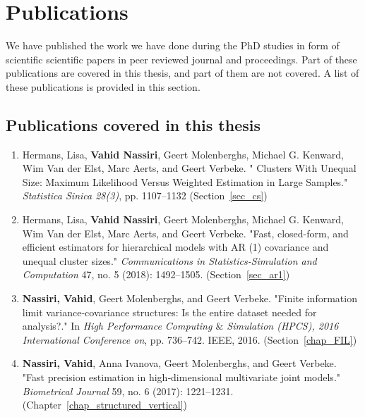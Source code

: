 \documentclass[11pt,a5paper,twoside]{book}
\begin{document}
\section{Publications}

We have published the work we have done during the PhD studies in form of scientific scientific papers in peer reviewed journal and proceedings. Part of these publications are covered in this thesis, and part of them are not covered. A list of these publications is provided in this section.

\subsection{Publications covered in this thesis}

\begin{enumerate}


	\item \textcolor[HTML]{222222}{Hermans, Lisa, \textbf{Vahid Nassiri}, Geert Molenberghs, Michael G. Kenward, Wim Van der Elst, Marc Aerts, and Geert Verbeke. "} \textcolor[HTML]{222222}{Clusters With Unequal Size: Maximum Likelihood Versus Weighted Estimation in Large Samples." \textit{Statistica Sinica 28(3)}, pp. 1107--1132} (Section~\ref{sec_cs})

	\item \textcolor[HTML]{222222}{Hermans, Lisa, \textbf{Vahid Nassiri}, Geert Molenberghs, Michael G. Kenward, Wim Van der Elst, Marc Aerts, and Geert Verbeke. "Fast, closed-form, and efficient estimators for hierarchical models with AR (1) covariance and unequal cluster sizes." \textit{Communications in Statistics-Simulation and Computation} 47, no. 5 (2018): 1492--1505.} (Section~\ref{sec_ar1})
	
	\item \textbf{\textcolor[HTML]{222222}{Nassiri, Vahid}}\textcolor[HTML]{222222}{, Geert Molenberghs, and Geert Verbeke. "Finite information limit variance-covariance structures: Is the entire dataset needed for analysis?." In \textit{High Performance Computing $\&$  Simulation (HPCS), 2016 International Conference on}, pp. 736--742. IEEE, 2016.} (Section~\ref{chap_FIL})


	
	\item \textbf{\textcolor[HTML]{222222}{Nassiri, Vahid}}\textcolor[HTML]{222222}{, Anna Ivanova, Geert Molenberghs, and Geert Verbeke. "Fast precision estimation in high‐dimensional multivariate joint models." \textit{Biometrical Journal} 59, no. 6 (2017): 1221--1231.} (Chapter~\ref{chap_structured_vertical})
	

\end{enumerate}
\end{document}
